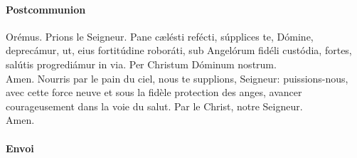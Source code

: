 \documentclass[twoside]{article}
\begin{document}
\paragraph{Postcommunion}
\begin{paracol}{2}
\vv Orémus.
\switchcolumn
\vv Prions le Seigneur.
\switchcolumn*
Pane cælésti refécti,
súpplices te, Dómine, deprecámur,
ut, eius fortitúdine roboráti,
sub Angelórum fidéli custódia,
fortes, salútis progrediámur in via.
Per Christum Dóminum nostrum.\\
\rr Amen.
\switchcolumn
Nourris par le pain du ciel,
nous te supplions, Seigneur:
puissions-nous, avec cette force neuve
et sous la fidèle protection des anges,
avancer courageusement dans la voie du salut.
Par le Christ, notre Seigneur.\\
\rr Amen.
\end{paracol}

\paragraph{Envoi}


\begin{paracol}{2}
\end{paracol}
\end{document}
